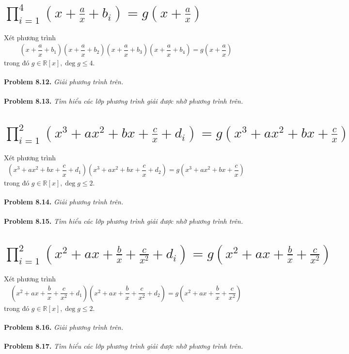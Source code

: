 \documentclass[a4paper,oneside]{book}
\numberwithin{equation}{chapter}
\begin{document}
\section{$\prod\limits_{i = 1}^4 {\left( {x + \frac{a}{x} + {b_i}} \right)}  = g\left( {x + \frac{a}{x}} \right)$}
Xét phương trình 
\begin{align}
\left( {x + \dfrac{a}{x} + {b_1}} \right)\left( {x + \dfrac{a}{x} + {b_2}} \right)\left( {x + \dfrac{a}{x} + {b_3}} \right)\left( {x + \dfrac{a}{x} + {b_4}} \right) = g\left( {x + \dfrac{a}{x}} \right)
\end{align}
trong đó $g \in \mathbb{R} \left[ x \right],\deg g \le 4$.\\
\\
\textbf{Problem 8.12.} \textit{Giải phương trình trên.}\\
\\
\textbf{Problem 8.13.} \textit{Tìm hiểu các lớp phương trình giải được nhờ phương trình trên.}
\section{$\prod\limits_{i = 1}^2 {\left( {{x^3} + a{x^2} + bx + \frac{c}{x} + {d_i}} \right)}  = g\left( {{x^3} + a{x^2} + bx + \frac{c}{x}} \right)$}
Xét phương trình 
\begin{align}
\left( {{x^3} + a{x^2} + bx + \dfrac{c}{x} + {d_1}} \right)\left( {{x^3} + a{x^2} + bx + \dfrac{c}{x} + {d_2}} \right) = g\left( {{x^3} + a{x^2} + bx + \dfrac{c}{x}} \right)
\end{align}
trong đó $g \in \mathbb{R} \left[ x \right],\deg g \le 2$.\\
\\
\textbf{Problem 8.14.} \textit{Giải phương trình trên.}\\
\\
\textbf{Problem 8.15.} \textit{Tìm hiểu các lớp phương trình giải được nhờ phương trình trên.}
\section{$\prod\limits_{i = 1}^2 {\left( {{x^2} + ax + \frac{b}{x} + \frac{c}{{{x^2}}} + {d_i}} \right)}  = g\left( {{x^2} + ax + \frac{b}{x} + \frac{c}{{{x^2}}}} \right)$}
Xét phương trình 
\begin{align}
\left( {{x^2} + ax + \dfrac{b}{x} + \dfrac{c}{{{x^2}}} + {d_1}} \right)\left( {{x^2} + ax + \dfrac{b}{x} + \dfrac{c}{{{x^2}}} + {d_2}} \right) = g\left( {{x^2} + ax + \dfrac{b}{x} + \dfrac{c}{{{x^2}}}} \right)
\end{align}
trong đó $g \in \mathbb{R} \left[ x \right],\deg g \le 2$.\\
\\
\textbf{Problem 8.16.} \textit{Giải phương trình trên.}\\
\\
\textbf{Problem 8.17.} \textit{Tìm hiểu các lớp phương trình giải được nhờ phương trình trên.}
\end{document}
